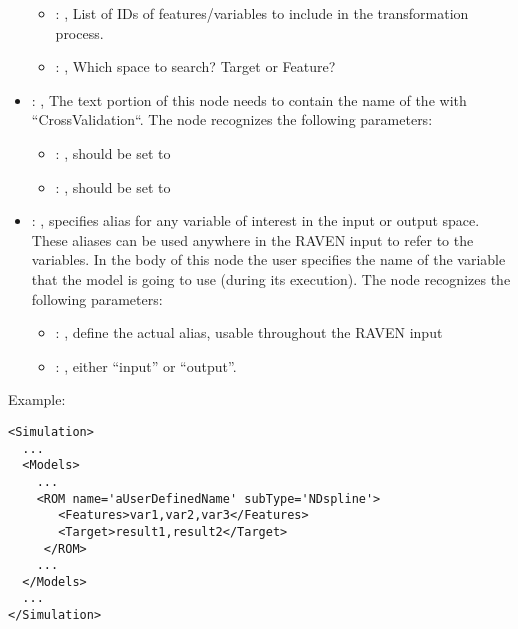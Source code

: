 \begin{itemize}
\begin{itemize}
        \item {}: ,
          List of IDs of features/variables to include in the transformation process.

        \item {}: ,
          Which space to search? Target or Feature?
      \end{itemize}

    \item {}: ,
      The text portion of this node needs to contain the name of the  with
               ``CrossValidation``.
      The  node recognizes the following parameters:
        \begin{itemize}
          \item {}: ,
            should be set to 
          \item {}: ,
            should be set to 
      \end{itemize}

    \item {}: ,
      specifies alias for         any variable of interest in the input or output space. These
      aliases can be used anywhere in the RAVEN input to         refer to the variables. In the body
      of this node the user specifies the name of the variable that the model is going to use
      (during its execution).
      The  node recognizes the following parameters:
        \begin{itemize}
          \item {}: ,
            define the actual alias, usable throughout the RAVEN input
          \item {}: ,
            either ``input'' or ``output''.
      \end{itemize}
  \end{itemize}

\hspace{24pt}
Example:
\begin{lstlisting}[style=XML]
<Simulation>
  ...
  <Models>
    ...
    <ROM name='aUserDefinedName' subType='NDspline'>
       <Features>var1,var2,var3</Features>
       <Target>result1,result2</Target>
     </ROM>
    ...
  </Models>
  ...
</Simulation>
\end{lstlisting}


